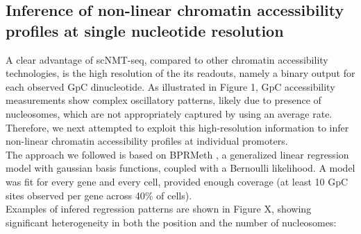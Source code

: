 
\subsection{Inference of non-linear chromatin accessibility profiles at single nucleotide resolution}
A clear advantage of scNMT-seq, compared to other chromatin accessibility technologies, is the high resolution of the its readouts, namely a binary output for each observed GpC dinucleotide. As illustrated in Figure 1, GpC accessibility measurements show complex oscillatory patterns, likely due to presence of nucleosomes, which are not appropriately captured by using an average rate. Therefore, we next attempted to exploit this high-resolution information to infer non-linear chromatin accessibility profiles at individual promoters.\\
The approach we followed is based on BPRMeth \cite{Kapourani2018}, a generalized linear regression model with gaussian basis functions, coupled with a Bernoulli likelihood. A model was fit for every gene and every cell, provided enough coverage (at least 10 GpC sites observed per gene across 40\% of cells).\\
 Examples of infered regression patterns are shown in Figure X, showing significant heterogeneity in both the position and the number of nucleosomes:

